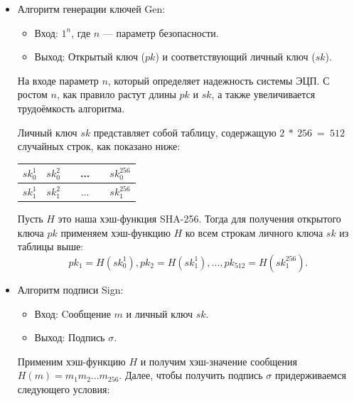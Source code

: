 \documentclass[a4paper, 14pt]{extarticle}
\begin{document}
\begin{itemize}
    \item Алгоритм генерации ключей Gen:

    \begin{itemize}
        \item Вход: $1^{n}$, где $n$ --- параметр безопасности.
        \item Выход: Открытый ключ ($pk$) и соответствующий личный ключ ($sk$).
    \end{itemize}

    На входе параметр $n$, который определяет надежность системы ЭЦП. С ростом $n$, как правило растут длины $pk$ и $sk$, а также увеличивается трудоёмкость алгоритма.

    Личный ключ $sk$ представляет собой таблицу, содержащую $2\ *\ 256\ =\ 512$ случайных строк, как показано ниже:

    \begin{center}
        \begin{tabular}{ |c|c|c|c|c|c| } 
         \hline
         $sk^{1}_{0}$ & $sk^{2}_{0}$ & \hspace{3mm} & ... & \hspace{3mm} & $sk^{256}_{0}$ \\ 
         \hline
         $sk^{1}_{1}$ & $sk^{2}_{1}$ & \hspace{3mm} & ... & \hspace{3mm} & $sk^{256}_{1}$ \\ 
         \hline
        \end{tabular}
    \end{center}

    Пусть $H$ это наша хэш-функция SHA-256. Тогда для получения открытого ключа $pk$ применяем хэш-функцию $H$ ко всем строкам личного ключа $sk$ из таблицы выше:
    \[pk_{1}=H(sk^{1}_{0}), pk_{2}=H(sk^{1}_{1}), ..., pk_{512}=H(sk^{256}_{1})\text{.}\]

    \item Алгоритм подписи Sign:

    \begin{itemize}
        \item Вход: Cообщение $m$ и личный ключ $sk$.
        \item Выход: Подпись $\sigma$.
    \end{itemize}

    Применим хэш-функцию $H$ и получим хэш-значение сообщения $H(m)=m_{1}m_{2}...m_{256}$. Далее, чтобы получить подпись $\sigma$ придерживаемся следующего условия:


\end{itemize}
\end{document}
